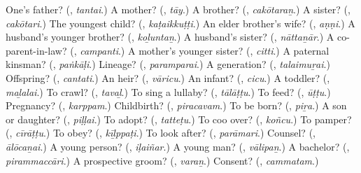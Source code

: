 \begin{tcolorbox}[breakable,colback=teal!4,colframe=teal!35!black,title={Before you move on}]
One’s father? (\textbf{}, \emph{tantai}.) A mother? (\textbf{}, \emph{tāy}.) A brother? (\textbf{}, \emph{cakōtaraṉ}.) A sister? (\textbf{}, \emph{cakōtari}.) The youngest child? (\textbf{}, \emph{kaṭaikkuṭṭi}.) An elder brother’s wife? (\textbf{}, \emph{aṇṇi}.) A husband’s younger brother? (\textbf{}, \emph{koḻuntaṉ}.) A husband’s sister? (\textbf{}, \emph{nāttaṉār}.) A co-parent-in-law? (\textbf{}, \emph{campanti}.) A mother’s younger sister? (\textbf{}, \emph{citti}.) A paternal kinsman? (\textbf{}, \emph{paṅkāḷi}.) Lineage? (\textbf{}, \emph{paramparai}.) A generation? (\textbf{}, \emph{talaimuṟai}.) Offspring? (\textbf{}, \emph{cantati}.) An heir? (\textbf{}, \emph{vāricu}.) An infant? (\textbf{}, \emph{cicu}.) A toddler? (\textbf{}, \emph{maḻalai}.) To crawl? (\textbf{}, \emph{tavaḻ}.) To sing a lullaby? (\textbf{}, \emph{tālāṭṭu}.) To feed? (\textbf{}, \emph{ūṭṭu}.) Pregnancy? (\textbf{}, \emph{karppam}.) Childbirth? (\textbf{}, \emph{piracavam}.) To be born? (\textbf{}, \emph{piṟa}.) A son or daughter? (\textbf{}, \emph{piḷḷai}.) To adopt? (\textbf{}, \emph{tatteṭu}.) To coo over? (\textbf{}, \emph{koñcu}.) To pamper? (\textbf{}, \emph{cīrāṭṭu}.) To obey? (\textbf{}, \emph{kīḻppaṭi}.) To look after? (\textbf{}, \emph{parāmari}.) Counsel? (\textbf{}, \emph{ālōcaṉai}.) A young person? (\textbf{}, \emph{iḷaiñar}.) A young man? (\textbf{}, \emph{vālipaṉ}.) A bachelor? (\textbf{}, \emph{pirammaccāri}.) A prospective groom? (\textbf{}, \emph{varaṉ}.) Consent? (\textbf{}, \emph{cammatam}.)
\end{tcolorbox}
